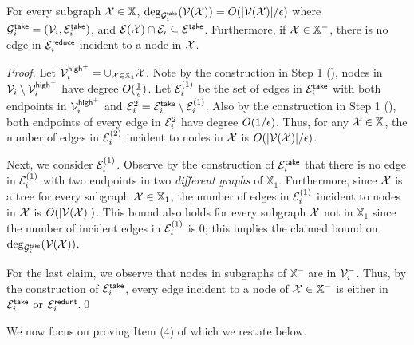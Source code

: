 \begin{lemma}\label{lm:Item1Clustering1E} For every subgraph $\mathcal{X} \in \mathbb{X}$,  $\deg_{\mathcal{G}^{\mathsf{take}}_i}(\mathcal{V}(\mathcal{X})) = O(|\mathcal{V}(\mathcal{X})|/\epsilon)$  where $\mathcal{G}^{\mathsf{take}}_i = (\mathcal{V}_i,\mathcal{E}_i^{\mathsf{take}})$, and $\mathcal{E}(\mathcal{X})\cap \mathcal{E}_i \subseteq \mathcal{E}^{\mathsf{take}}$. Furthermore, if $\mathcal{X} \in \mathbb{X}^{-}$, there is no edge in $\mathcal{E}_i^{\mathsf{reduce}}$ incident to a node in $\mathcal{X}$.
\end{lemma}
\begin{proof} 	Let $\mathcal{V}^{\mathsf{high}^+}_i = \cup_{\mathcal{X}\in \mathbb{X}_1}\mathcal{X}$. Note by the construction in Step 1 (), nodes in $\mathcal{V}_i\setminus \mathcal{V}^{\mathsf{high}^+}_i$ have degree $O(\frac{1}{\epsilon})$. Let $\mathcal{E}_i^{(1)}$  be the set of edges in $\mathcal{E}_i^{\mathsf{take}}$ with both endpoints in $\mathcal{V}^{\mathsf{high}^+}_i$ and $\mathcal{E}_i^{2} =\mathcal{E}_i^{\mathsf{take}}\setminus \mathcal{E}_i^{(1)}$. Also by the construction in Step 1 (), both endpoints of every edge in $\mathcal{E}_i^{2}$ have degree $O(1/\epsilon)$. Thus, for any $\mathcal{X}\in \mathbb{X}$, the number of edges in $\mathcal{E}_i^{(2)}$ incident to nodes in $\mathcal{X}$ is $O(|\mathcal{V}(\mathcal{X})|/\epsilon)$. 
	
	Next, we consider  $\mathcal{E}_i^{(1)}$. Observe by the construction of $\mathcal{E}_i^{\mathsf{take}}$ that there is no edge in  $\mathcal{E}_i^{(1)}$  with two endpoints in two \emph{different graphs} of $\mathbb{X}_1$. Furthermore, since $\mathcal{X}$ is a tree for every subgraph $\mathcal{X}\in \mathbb{X}_1$, the number of edges in  $\mathcal{E}_i^{(1)}$   incident to nodes in $\mathcal{X}$ is $O(|\mathcal{V}(\mathcal{X})|)$. This bound also holds for every subgraph $\mathcal{X}$ not in $\mathbb{X}_1$ since the number of incident edges in $\mathcal{E}_i^{(1)}$ is 0; this implies the claimed bound on $\deg_{\mathcal{G}^{\mathsf{take}}_i}(\mathcal{V}(\mathcal{X}))$.
	
	For the last claim, we observe that nodes in subgraphs of  $\mathbb{X}^{-}$ are in $\mathcal{V}_i^{-}$. Thus, by the construction of $\mathcal{E}_i^{\mathsf{take}}$, every edge incident to a node of  $\mathcal{X} \in \mathbb{X}^{-}$ is either in $\mathcal{E}_i^{\mathsf{take}}$ or $\mathcal{E}_i^{\mathsf{redunt}}$.\qed
\end{proof}


We now focus on proving Item (4) of  which we restate below.


